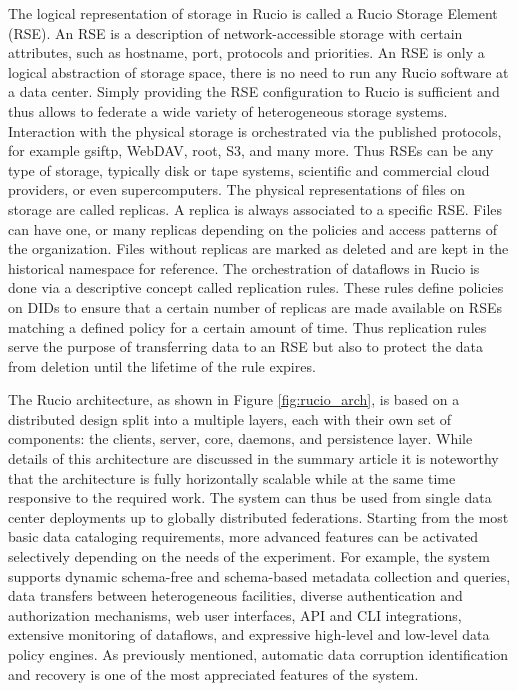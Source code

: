 \documentclass[11pt]{article}
\begin{document}
The logical representation of storage in Rucio is called a Rucio Storage Element (RSE). An RSE is a description of network-accessible storage with certain attributes, such as hostname, port, protocols and priorities. An RSE is only a logical abstraction of storage space, there is no need to run any Rucio software at a data center. Simply providing the RSE configuration to Rucio is sufficient and thus allows to federate a wide variety of heterogeneous storage systems. Interaction with the physical storage is orchestrated via the published protocols, for example gsiftp, WebDAV, root, S3, and many more. Thus RSEs can be any type of storage, typically disk or tape systems, scientific and commercial cloud providers, or even supercomputers. The physical representations of files on storage are called replicas. A replica is always associated to a specific RSE. Files can have one, or many replicas depending on the policies and access patterns of the organization. Files without replicas are marked as deleted and are kept in the historical namespace for reference. The orchestration of dataflows in Rucio is done via a descriptive concept called replication rules. These rules define policies on DIDs to ensure that a certain number of replicas are made available on RSEs matching a defined policy for a certain amount of time. Thus replication rules serve the purpose of transferring data to an RSE but also to protect the data from deletion until the lifetime of the rule expires.

The Rucio architecture, as shown in Figure \ref{fig:rucio_arch}, is based on a distributed design split into a multiple layers, each with their own set of components: the clients, server, core, daemons, and persistence layer. While details of this architecture are discussed in the summary article it is noteworthy that the architecture is fully horizontally scalable while at the same time responsive to the required work. The system can thus be used from single data center deployments up to globally distributed federations. Starting from the most basic data cataloging requirements, more advanced features can be activated selectively depending on the needs of the experiment. For example, the system supports dynamic schema-free and schema-based metadata collection and queries, data transfers between heterogeneous facilities, diverse authentication and authorization mechanisms, web user interfaces, API and CLI integrations, extensive monitoring of dataflows, and expressive high-level and low-level data policy engines. As previously mentioned, automatic data corruption identification and recovery is one of the most appreciated features of the system.
\end{document}
